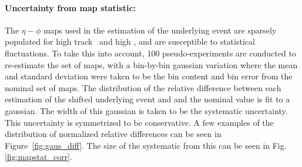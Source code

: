 \paragraph{Uncertainty from map statistic:} 
The $\eta-\phi$ maps used in the estimation of the underlying event are sparsely populated for high track \pt\ and high \ptjet, and are susceptible to statistical fluctuations.
To take this into account, 100 pseudo-experiments are conducted to re-estimate the set of maps, with a bin-by-bin gaussian variation where the mean and standard deviation were taken to be the bin content and bin error from the nominal set of maps.
The distribution of the relative difference between each estimation of the shifted underlying event and and the nominal value is fit to a gaussian.
The width of this gaussian is taken to be the systematic uncertainty.
This uncertainty is symmetrized to be conservative.
A few examples of the distribution of normalized relative differences can be seen in Figure~\ref{fig:gaus_diff}.
The size of the systematic from this can be seen in Fig.\ref{fig:mapstat_corr}.


